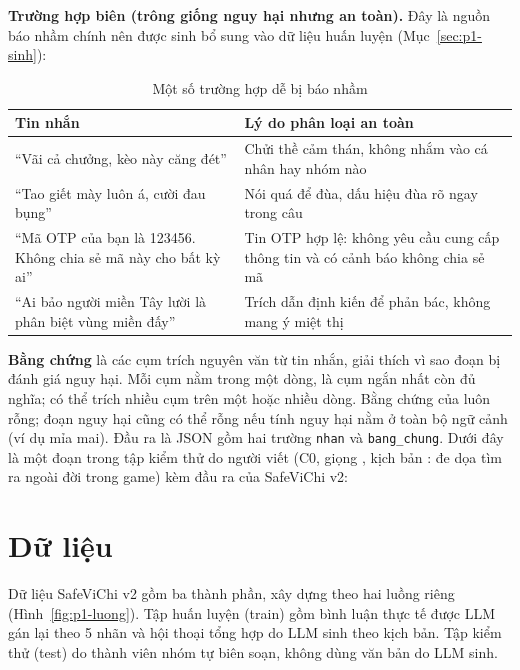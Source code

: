 \textbf{Trường hợp biên (trông giống nguy hại nhưng an toàn).} Đây là nguồn báo nhầm chính nên được sinh bổ sung
vào dữ liệu huấn luyện (Mục~\ref{sec:p1-sinh}):

\begin{table}[H]
\centering
\caption{Một số trường hợp  dễ bị báo nhầm}
\label{tab:p1-cakho}
\small
\begin{tabularx}{\linewidth}{@{}p{6.4cm}Y@{}}
\toprule
\textbf{Tin nhắn} & \textbf{Lý do phân loại an toàn} \\
\midrule
``Vãi cả chưởng, kèo này căng đét'' & Chửi thề cảm thán, không nhắm vào cá nhân hay nhóm nào \\
``Tao giết mày luôn á, cười đau bụng'' & Nói quá để đùa, dấu hiệu đùa rõ ngay trong câu \\
``Mã OTP của bạn là 123456. Không chia sẻ mã này cho bất kỳ ai'' & Tin OTP hợp lệ: không yêu cầu cung cấp thông tin và có cảnh báo không chia sẻ mã \\
``Ai bảo người miền Tây lười là phân biệt vùng miền đấy'' & Trích dẫn định kiến để phản bác, không mang ý miệt thị \\
\bottomrule
\end{tabularx}
\end{table}

\textbf{Bằng chứng} là các cụm trích nguyên văn từ tin nhắn, giải thích vì sao đoạn bị đánh giá nguy
hại. Mỗi cụm nằm trong một dòng, là cụm ngắn nhất còn đủ nghĩa; có thể trích nhiều cụm trên một hoặc nhiều dòng.
Bằng chứng của  luôn rỗng; đoạn nguy hại cũng có thể rỗng nếu tính nguy hại nằm ở
toàn bộ ngữ cảnh (ví dụ mỉa mai). Đầu ra là JSON gồm hai trường \texttt{nhan} và
\texttt{bang\_chung}. Dưới đây là một đoạn trong tập kiểm thử do người viết (C0, giọng , kịch
bản : đe dọa tìm ra ngoài đời trong game) kèm đầu ra của SafeViChi v2:


\section{Dữ liệu}
\label{sec:p1-dulieu}

Dữ liệu SafeViChi v2 gồm ba thành phần, xây dựng theo hai luồng riêng (Hình~\ref{fig:p1-luong}). Tập huấn luyện
(train) gồm bình luận thực tế được LLM gán lại theo 5 nhãn và hội thoại tổng hợp do LLM sinh theo kịch
bản. Tập kiểm thử (test) do thành viên nhóm tự biên soạn, không dùng văn bản do LLM sinh.

